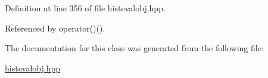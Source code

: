 \-Definition at line 356 of file histevalobj.\-hpp.



\-Referenced by operator()().



\-The documentation for this class was generated from the following file\-:\begin{DoxyCompactItemize}
\item 
\hyperlink{histevalobj_8hpp}{histevalobj.\-hpp}\end{DoxyCompactItemize}
